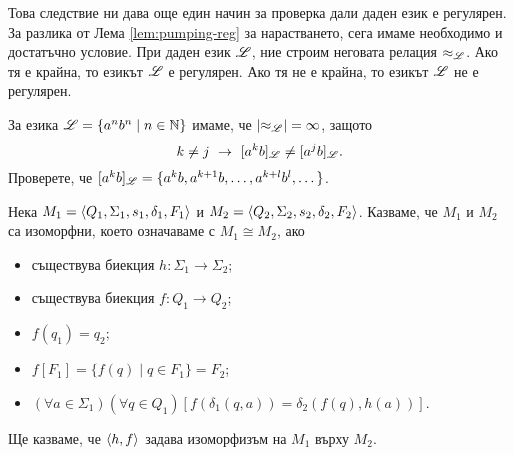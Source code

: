 Това следствие ни дава още един начин за проверка дали даден език е регулярен.
За разлика от Лема \ref{lem:pumping-reg} за нарастването, сега имаме
необходимо и достатъчно условие.
При даден език $\mathscr{L}$, ние строим неговата релация $\approx_{\mathscr{L}}$.
Ако тя е крайна, то езикът $\mathscr{L}$ е регулярен.
Ако тя не е крайна, то езикът $\mathscr{L}$ не е регулярен.

\begin{example}
  За езика $\mathscr{L} = \{a^nb^n\mid n \in \mathbb{N}\}$ имаме, че $\vert{\approx_{\mathscr{L}}}\vert = \infty$,
  защото \[k \neq j\ \rightarrow\ [a^kb]_\Ls \neq [a^jb]_\Ls.\]
  Проверете, че $[a^kb]_{\mathscr{L}} = \{a^kb,a^{k+1}b,\dots,a^{k+l}b^l,\dots\}$.
\end{example}

\begin{dfn}
  Нека $M_1 = \langle{Q_1,\Sigma_1,s_1,\delta_1,F_1}\rangle$ и $M_2 = \langle{Q_2,\Sigma_2,s_2,\delta_2,F_2}\rangle$.
  Казваме, че $M_1$ и $M_2$ са изоморфни, което означаваме с $M_1 \cong M_2$, ако
  \begin{itemize}
  \item
    съществува биекция $h:\Sigma_1 \to \Sigma_2$;
  \item
    съществува биекция $f: Q_1\to Q_2$;
  \item
    $f(q_1) = q_2$;
  \item
    $f[F_1] = \{f(q)\mid q\in F_1\} = F_2$;
  \item
    $(\forall a\in\Sigma_1)(\forall q\in Q_1)[f(\delta_1(q,a)) = \delta_2(f(q),h(a))]$.
  \end{itemize}
  Ще казваме, че $\langle{h,f}\rangle$ задава изоморфизъм на $M_1$ върху $M_2$.
\end{dfn}

